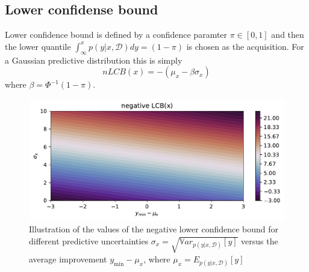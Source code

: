 




\subsection{Lower confidense bound}
Lower confidence bound is defined by a confidence paramter $\pi \in [0,1]$
and then the lower quantile $\int_{\infty}^x p(y|x,\mathcal{D})dy = (1-\pi)$
is chosen as the acquisition. For a Gaussian predictive distribution this is 
simply 
$$nLCB(x) = - (\mu_x - \beta \sigma_x)$$
where $\beta = \Phi^{-1}(1-\pi)$.  
\begin{figure}%
    \centering
    \includegraphics[width=\textwidth]{Pictures/neg_lower_confidence_illustration.pdf}
    \caption{Illustration of the values of the negative lower confidence bound for different predictive
    uncertainties $\sigma_x = \sqrt{\mathbb{V}ar_{p(y|x,\mathcal{D})}[y]}$ versus the average
    improvement $y_{\min}-\mu_x$, where $\mu_x = E_{p(y|x,\mathcal{D})}[y]$}
    \label{nLCB_illustration}
\end{figure}


